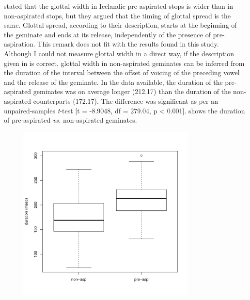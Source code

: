 \documentclass[11pt,a4paper,openany]{memoir}\usepackage[]{graphicx}\usepackage[]{color}
\newenvironment{knitrout}{}{} %
\begin{document}
\citet[70--71]{ladefoged1996} stated that the glottal width in Icelandic pre-aspirated stops is wider than in non-aspirated stops, but they argued that the timing of glottal spread is the same.
Glottal spread, according to their description, starts at the beginning of the geminate and ends at its release, independently of the presence of pre-aspiration. 
This remark does not fit with the results found in this study.
Although I could not measure glottal width in a direct way, if the description given in \citet{ladefoged1996} is correct, glottal width in non-aspirated geminates can be inferred from the duration of the interval between the offset of voicing of the preceding vowel and the release of the geminate.
In the data available, the duration of the pre-aspirated geminates was on average longer (212.17) than the duration of the non-aspirated counterparts (172.17).
The difference was significant as per an unpaired-samples \textit{t}-test [t = -8.9048, df = 279.04, p < 0.001].
 shows the duration of pre-aspirated \textit{vs.} non-aspirated geminates.


\begin{figure}
\centering
\begin{knitrout}
\color{fgcolor}
\includegraphics[width=0.8\textwidth]{img/geminates-duration-1} 

\end{knitrout}
\caption{
}
\label{f:geminatedur}
\end{figure}

\end{document}
